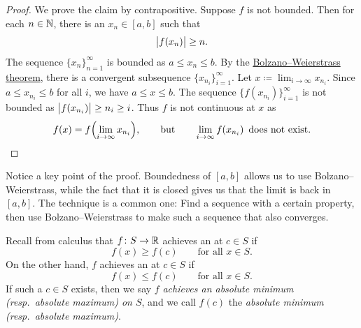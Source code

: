 \begin{proof}
We prove the claim by contrapositive.  Suppose $f$ is not bounded.
Then for each
$n \in {\mathbb{N}}$, there is an $x_n \in [a,b]$ such that
\begin{equation*}
\bigl\lvert {f(x_n)} \bigr\rvert \geq n .
\end{equation*}
The sequence $\{ x_n \}_{n=1}^\infty$ is bounded as $a \leq x_n \leq b$.
By the \hyperref[thm:bwseq]{Bolzano--Weierstrass theorem},
there is a convergent subsequence $\{ x_{n_i} \}_{i=1}^\infty$.
Let $x \coloneqq \lim_{i\to\infty} x_{n_i}$.
Since $a \leq x_{n_i} \leq b$ for all $i$, we have $a \leq x \leq b$.
The sequence $\bigl\{ f(x_{n_i}) \bigr\}_{i=1}^\infty$ is not bounded 
as 
$\bigl\lvert {f(x_{n_i})} \bigr\rvert \geq n_i \geq i$.
Thus $f$ is not continuous at $x$ as
\begin{equation*}
f(x)
=
f\Bigl( \lim_{i\to\infty} x_{n_i} \Bigr) ,
\qquad \text{but} \qquad
\lim_{i\to\infty} f(x_{n_i}) \enspace \text{does not exist.} \qedhere
\end{equation*}
\end{proof}

Notice a key point of the proof.
Boundedness of $[a,b]$ allows us to use Bolzano--Weierstrass,
while the fact that it is closed gives us that the limit is back in $[a,b]$.
The technique is a common one: Find a sequence with a certain property,
then use Bolzano--Weierstrass to make such a sequence that also converges.

Recall from calculus that $f \colon S \to {\mathbb{R}}$ achieves an
\emph{}%
at $c \in S$ if
\begin{equation*}
f(x) \geq f(c) \qquad \text{for all } x \in S.
\end{equation*}
On the other hand, $f$ achieves an 
\emph{}%
at $c \in S$ if
\begin{equation*}
f(x) \leq f(c) \qquad \text{for all } x \in S.
\end{equation*}
If such a $c \in S$ exists, then we say
$f$ \emph{achieves an absolute minimum (resp.\ absolute maximum) on
$S$}, and we call
$f(c)$ the \emph{absolute minimum (resp.\ absolute maximum)}.
\begin{myfigureht}
\caption{$f \colon [a,b] \to \R$ achieves an absolute maximum $f(c)$ at
$c$, and an absolute minimum $f(d)$ at $d$.\label{fig:minmax}}
\end{myfigureht}

